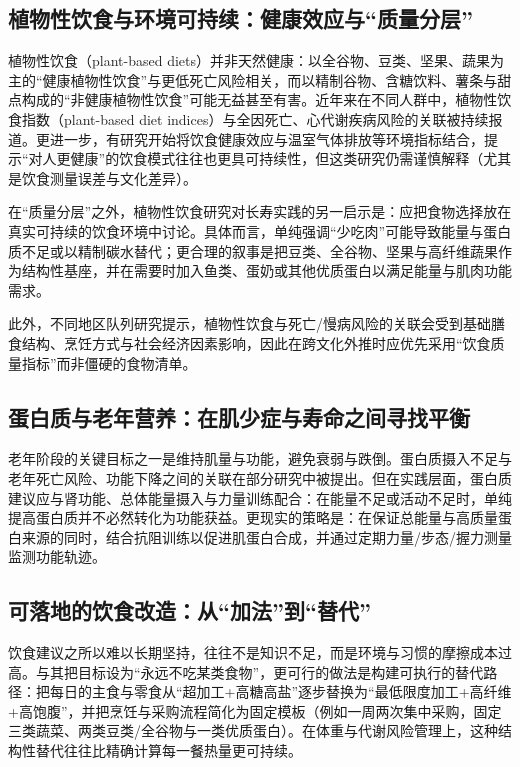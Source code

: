 \documentclass[11pt,a4paper]{article}
\begin{document}
\subsection{植物性饮食与环境可持续：健康效应与“质量分层”}

植物性饮食（plant-based diets）并非天然健康：以全谷物、豆类、坚果、蔬果为主的“健康植物性饮食”与更低死亡风险相关，而以精制谷物、含糖饮料、薯条与甜点构成的“非健康植物性饮食”可能无益甚至有害。近年来在不同人群中，植物性饮食指数（plant-based diet indices）与全因死亡、心代谢疾病风险的关联被持续报道\cite{plantbaseddiet2025,plantbaseddiets2025,plantbaseddiets20251,associationbetweenplant2023}。更进一步，有研究开始将饮食健康效应与温室气体排放等环境指标结合，提示“对人更健康”的饮食模式往往也更具可持续性，但这类研究仍需谨慎解释（尤其是饮食测量误差与文化差异）。\cite{plantbaseddiet2025,theassociationbetween2025}

在“质量分层”之外，植物性饮食研究对长寿实践的另一启示是：应把食物选择放在真实可持续的饮食环境中讨论。具体而言，单纯强调“少吃肉”可能导致能量与蛋白质不足或以精制碳水替代；更合理的叙事是把豆类、全谷物、坚果与高纤维蔬果作为结构性基座，并在需要时加入鱼类、蛋奶或其他优质蛋白以满足能量与肌肉功能需求。\cite{plantbaseddietary2023,theimpactsof2016}

此外，不同地区队列研究提示，植物性饮食与死亡/慢病风险的关联会受到基础膳食结构、烹饪方式与社会经济因素影响，因此在跨文化外推时应优先采用“饮食质量指标”而非僵硬的食物清单。\cite{theassociationbetween2024,healthydietaryindices2018}

\subsection{蛋白质与老年营养：在肌少症与寿命之间寻找平衡}

老年阶段的关键目标之一是维持肌量与功能，避免衰弱与跌倒。蛋白质摄入不足与老年死亡风险、功能下降之间的关联在部分研究中被提出\cite{anincreasedneed2015}。但在实践层面，蛋白质建议应与肾功能、总体能量摄入与力量训练配合：在能量不足或活动不足时，单纯提高蛋白质并不必然转化为功能获益。更现实的策略是：在保证总能量与高质量蛋白来源的同时，结合抗阻训练以促进肌蛋白合成，并通过定期力量/步态/握力测量监测功能轨迹。\cite{handgripstrengthis2020}

\subsection{可落地的饮食改造：从“加法”到“替代”}

饮食建议之所以难以长期坚持，往往不是知识不足，而是环境与习惯的摩擦成本过高。与其把目标设为“永远不吃某类食物”，更可行的做法是构建可执行的替代路径：把每日的主食与零食从“超加工+高糖高盐”逐步替换为“最低限度加工+高纤维+高饱腹”，并把烹饪与采购流程简化为固定模板（例如一周两次集中采购，固定三类蔬菜、两类豆类/全谷物与一类优质蛋白）。在体重与代谢风险管理上，这种结构性替代往往比精确计算每一餐热量更可持续\cite{dga2020}。
\end{document}
